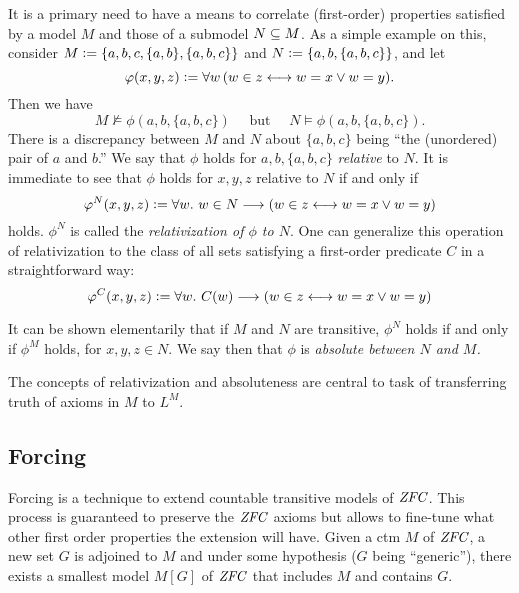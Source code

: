 It is a primary need to have a means to correlate  (first-order)
properties satisfied by a model $M$ and those of a 
submodel $N\subseteq M$. As a simple example on this, consider 
$M\mathrel{\mathop:}= \{a,b,c, \{a,b\},\{a,b,c\}\}$ and
$N\mathrel{\mathop:}=\{a,b,\{a,b,c\}\}$, and let 
\[
\varphi(x,y,z)\mathrel{\mathop:}= \forall w \,( w\in z \longleftrightarrow w=x \vee w=y).
\]
Then we have
\[
M\not\models \phi(a,b,\{a,b,c\}) \quad\text{ but }\quad N\models \phi(a,b,\{a,b,c\}).
\]
There is a discrepancy between  $M$ and $N$ about $\{a,b,c\}$ being ``the
(unordered) pair of $a$ and $b$.'' We say that $\phi$ holds for
$a,b,\{a,b,c\}$ \emph{relative} to $N$. It is immediate to see that
$\phi$ holds  for $x,y,z$ relative to $N$ if and only if
\[
\varphi^N(x,y,z)\mathrel{\mathop:}= \forall w.\ w\in N\longrightarrow ( w\in z \longleftrightarrow w=x \vee w=y)
\] 
holds. $\phi^N$ is called the \emph{relativization of $\phi$ to
  $N$}. One can generalize this operation of relativization to the
class of all sets satisfying a first-order predicate $C$ in a
straightforward way:
\[
\varphi^C(x,y,z)\mathrel{\mathop:}= \forall w.\ C(w)\longrightarrow ( w\in z \longleftrightarrow w=x \vee w=y)
\] 

It can be shown elementarily that if $M$ and $N$ are transitive,
$\phi^N$ holds if and only if $\phi^M$ holds,  for $x,y,z\in N$. We
say then that $\phi$ is \emph{absolute between $N$ and $M$.}

The concepts of relativization and absoluteness are central to task of
transferring truth of axioms in $M$ to  $L^M$. 


\subsection{Forcing}
Forcing is a technique to extend countable transitive models of
$\mathit{ZFC}$. This process is guaranteed to preserve the $\mathit{ZFC}$
axioms but allows to fine-tune what other first order properties the
extension will have. Given a ctm $M$ of $\mathit{ZFC}$, a new set $G$ is
adjoined to $M$ and under some hypothesis ($G$ being ``generic''),
there exists a smallest model $M[G]$ of $\mathit{ZFC}$ that includes $M$ and
contains $G$. 

